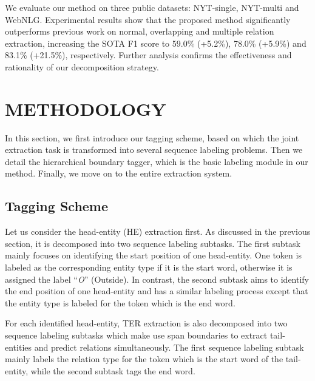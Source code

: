 \documentclass{ecai}
\begin{document}
We evaluate our method on three public datasets: NYT-single, NYT-multi and WebNLG. Experimental results show that the proposed method significantly outperforms previous work on normal, overlapping and multiple relation extraction, increasing the SOTA F1 score to 59.0\% (+5.2\%), 78.0\% (+5.9\%) and 83.1\% (+21.5\%), respectively.
Further analysis confirms the effectiveness and rationality of our decomposition strategy.






\section{METHODOLOGY}
\label{sec:method}

In this section, we first introduce our tagging scheme, based on which the joint extraction task is transformed into several sequence labeling problems. 
Then we detail the hierarchical boundary tagger, which is the basic labeling module in our method. 
Finally, we move on to the entire extraction system.


\subsection{Tagging Scheme}
\label{sec:scheme}

Let us consider the head-entity (HE) extraction first. As discussed in the previous section, it is decomposed into two sequence labeling subtasks.
The first subtask mainly focuses on identifying the start position of one head-entity. One token is labeled as the corresponding entity type if it is the start word, otherwise it is assigned the label ``\emph{O}'' (Outside).
In contrast, the second subtask aims to identify the end position of one head-entity and has a similar labeling process except that the entity type is labeled for the token which is the end word.

For each identified head-entity, TER extraction is also decomposed into two sequence labeling subtasks which make use span boundaries to extract tail-entities and predict relations simultaneously.
The first sequence labeling subtask mainly labels the relation type for the token which is the start word of the tail-entity, while the second subtask tags the end word. 
\end{document}
